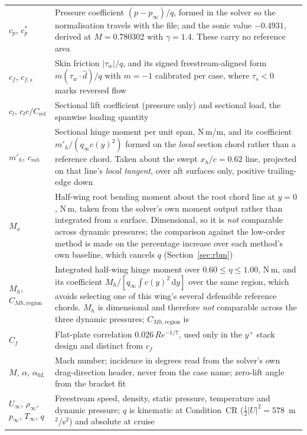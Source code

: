 \documentclass[10pt,a4paper]{article}
\begin{document}
{\begin{longtable}{@{}p{}p{}@{}}
\addlinespace
$c_p$, $c_p^{*}$ & Pressure coefficient $(p-p_\infty)/q$, formed in the solver so the
  normalisation travels with the file; and the sonic value $-0.4931$, derived at $M=0.780302$
  with $\gamma=1.4$. These carry no reference area \\
$c_f$, $c_{f,s}$ & Skin friction $|\tau_w|/q$, and its signed freestream-aligned form
  $m(\tau_w\!\cdot\!\hat{d})/q$ with $m=-1$ calibrated per case, where $\tau_s<0$ marks reversed
  flow \\
$c_l$, $c_l c/C_\mathrm{ref}$ & Sectional lift coefficient (pressure only) and sectional load,
  the spanwise loading quantity \\
$m'_h$, $c_{mh}$ & Sectional hinge moment per unit span, N\,m/m, and its coefficient
  $m'_h/(q_\infty c(y)^2)$ formed on the \emph{local} section chord rather than a reference
  chord. Taken about the swept $x_h/c = 0.62$ line, projected on that line's \emph{local
  tangent}, over aft surfaces only, positive trailing-edge down \\
$M_x$ & Half-wing root bending moment about the root chord line at $y = 0$, N\,m, taken from
  the solver's own moment output rather than integrated from a surface. Dimensional, so it is
  \emph{not} comparable across dynamic pressures; the comparison against the low-order method is
  made on the percentage increase over each method's own baseline, which cancels $q$
  (Section~\ref{sec:rbm}) \\
$M_h$, $C_{Mh,\mathrm{region}}$ & Integrated half-wing hinge moment over
  $0.60 \leq \eta \leq 1.00$, N\,m, and its coefficient
  $M_h/[q_\infty\!\int\! c(y)^2\,\mathrm{d}y]$ over the same region, which avoids selecting one
  of this wing's several defensible reference chords. $M_h$ is dimensional and therefore
  \emph{not} comparable across the three dynamic pressures; $C_{Mh,\mathrm{region}}$ is \\
$C_f$ & Flat-plate correlation $0.026\,Re^{-1/7}$, used only in the $y^+$ stack design and
  distinct from $c_f$ \\
\addlinespace
$M$, $\alpha$, $\alpha_{0L}$ & Mach number; incidence in degrees read from the solver's own
  drag-direction header, never from the case name; zero-lift angle from the bracket fit \\
$U_\infty$, $\rho_\infty$, $p_\infty$, $T_\infty$, $q$ & Freestream speed, density, static
  pressure, temperature and dynamic pressure; $q$ is kinematic at Condition~CR
  ($\tfrac{1}{2}|U|^2=578$~m$^2$/s$^2$) and absolute at cruise \\

\end{longtable}}
\end{document}
